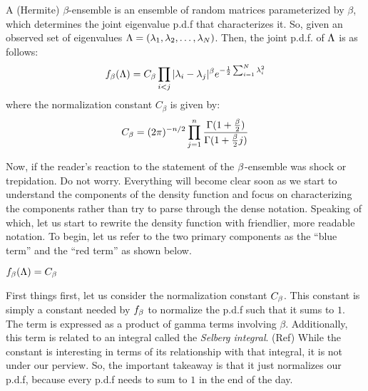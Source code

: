 \begin{definition}
A (Hermite) $\beta$-ensemble is an ensemble of random matrices parameterized by $\beta$, which determines the joint eigenvalue p.d.f that characterizes it.
So, given an observed set of eigenvalues $\L = (\seqo[N]{\lambda})$. Then, the joint p.d.f. of $\L$ is as follows:
\begin{align*}
\jepdf = C_\beta \prod_{i < j} |\lambda_i - \lambda_j|^\beta e^{-\frac{1}{2} \sum_{i=1}^N \lambda_i^2}
\end{align*}
where the normalization constant $C_\beta$ is given by:
\begin{align*}
C_{\beta} = (2\pi)^{-n/2} \prod_{j = 1}^n \frac{\Gamma(1 + \frac{\b}{2})}{\Gamma(1 + \frac{\b}{2}j)}
\end{align*}
\end{definition}


Now, if the reader's reaction to the statement of the $\b$-ensemble was shock or trepidation. Do not worry.
Everything will become clear soon as we start to understand the components of the density function and
focus on characterizing the components rather than try to parse through the dense notation.
Speaking of which, let us start to rewrite the density function with friendlier, more readable notation.
To begin, let us refer to the two primary components as the ``blue term'' and the ``red term'' as shown below.
\begin{center}
$\jepdf = \betaconst \; $\bbx{$\blueterm$} \; \rbx{$\redterm$}
\end{center}

 First things first, let us consider the normalization constant $\betaconst$.
This constant is simply a constant needed by $f_\b$ to normalize the p.d.f such that it sums to $1$.
The term is expressed as a product of gamma terms involving $\beta$. Additionally, this term is related to an integral called the \textit{Selberg integral}. (Ref)
While the constant is interesting in terms of its relationship with that integral, it is not under our perview. So, the important takeaway is that it just normalizes our p.d.f,
because every p.d.f needs to sum to $1$ in the end of the day.

